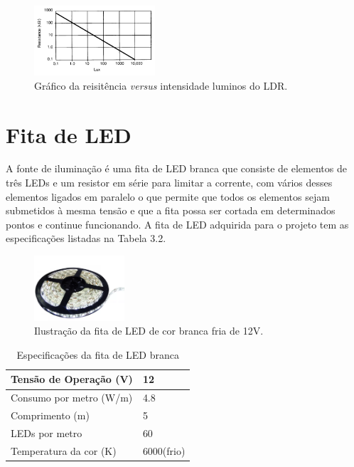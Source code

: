 \begin{figure}[htp]
    \begin{center}
    \includegraphics[width=0.4\textwidth]{figuras/reta.PNG}
    \end{center}
    \caption[Gráfico da reisitência \textit{versus} intensidade luminos do LDR.]{Gráfico da reisitência \textit{versus} intensidade luminos do LDR.}
    \label{reta}
\end{figure}

\section{Fita de LED}
A fonte de iluminação é uma fita de LED branca que consiste de elementos de três LEDs e um resistor em série para limitar a corrente, com vários desses elementos ligados em paralelo o que permite que todos os elementos sejam submetidos à mesma tensão e que a fita possa ser cortada em determinados pontos e continue funcionando. A fita de LED adquirida para o projeto tem as especificações listadas na Tabela 3.2.

\begin{figure}[htp]
    \begin{center}
    \includegraphics[width=0.3\textwidth]{figuras/fitaled.PNG}
    \end{center}
    \caption[Ilustração da fita de LED branca.]{Ilustração da fita de LED de cor branca fria de 12V.}
    \label{fitaled}
\end{figure}

 

\begin{table}
    \centering
    \label{fitaled_dados}
    \caption{Especificações da fita de LED branca}
    \begin{tabular}{ll} 
        \hline
        Tensão de Operação (V)  & 12            \\ 
        \hline
        Consumo por metro (W/m) & 4.8           \\ 
        \hline
        Comprimento (m)         & 5             \\ 
        \hline
        LEDs por metro          & 60            \\ 
        \hline
        Temperatura da cor (K)  & 6000(frio)    \\
        \hline
    \end{tabular}
\end{table}

